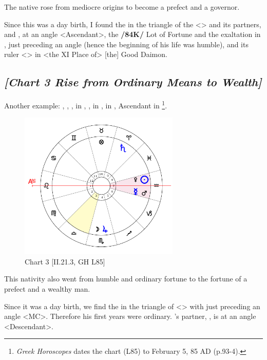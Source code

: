 The native rose from mediocre origins to become a prefect and a governor. 

Since this was a day birth, I found the \Sun\xspace in the triangle of the \Moon\xspace <\Taurus\xspace \Virgo\xspace \Capricorn> and its partners, \Venus\xspace and \Mars, at an angle <Ascendant>, the \textbf{/84K/} Lot of Fortune and the exaltation in \Gemini, just preceding an angle (hence the beginning of his life was humble), and its ruler <\Mercury> in <the XI Place of> [the] Good Daimon.
\newpage

\subsection*{\textit{[Chart 3 Rise from Ordinary Means to Wealth]}}

Another example: \Sun, \Mars, \Venus, \Mercury\xspace in \Aquarius, \Moon, \Jupiter\xspace in \Scorpio, \Saturn\xspace in \Aries, Ascendant in \Leo
\footnote{\textit{Greek Horoscopes} dates the chart (L85) to February 5, 85 AD (p.93-4).}.

\clearpage
\begin{figure}
\centering
\vspace{-25pt}
\includegraphics[width=0.68\textwidth]{charts/2_21_3}
\caption{Chart 3 [II.21.3, GH L85]}
\label{fig:chart03}
\end{figure}

This nativity also went from humble and ordinary fortune to the fortune of a prefect and a wealthy man. 

Since it was a day birth, we find the \Sun\xspace in the triangle of \Saturn\xspace <\Aquarius\xspace \Gemini\xspace \Libra> with \Saturn\xspace just preceding an angle <MC>. Therefore his first years were ordinary. \Saturn’s partner, \Mercury, is at an angle <Descendant>. 

